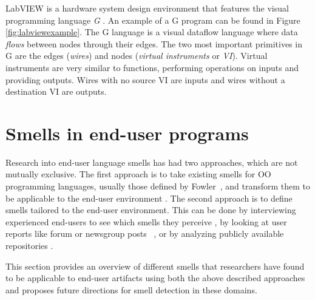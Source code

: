 \documentclass[10pt,conference,compsocconf]{IEEEtran}
\begin{document}
LabVIEW is a hardware system design environment that features the visual programming language \emph{G} . 
An example of a G program can be found in Figure \ref{fig:labviewexample}.
The G language is a visual dataflow language where data \emph{flows} between nodes through their edges.
The two most important primitives in G are the edges  (\textit{wires}) and nodes  (\textit{virtual instruments} or \emph{VI}).
Virtual instruments are very similar to functions,  performing  operations on inputs and providing outputs.
Wires with no source VI are inputs and wires without a destination VI are outputs. 


\section{Smells in end-user programs}
\label{sec:smells}
Research into end-user language smells has had two approaches, which are not mutually exclusive.
The first approach is to take existing smells for OO programming languages, usually those defined by Fowler~\cite{Fowl1999}, and transform them to be applicable to the end-user environment \cite{Hermans2012inter,Hermans2012intra,Stolee2011,StoleeTSE2013, chambers2013smell}.
The second approach is to define smells tailored to the end-user environment.
This can be done by interviewing experienced end-users to see which smells they perceive \cite{chambers2013smell}, by looking at user reports like forum or newsgroup posts~ \cite{badame2012refactoring,chambers2013smell}, or by analyzing publicly available repositories \cite{Stolee2011,StoleeTSE2013}.

This section provides an overview of different smells that researchers have found to be applicable to end-user artifacts using both the above described approaches and proposes future directions for smell detection in these domains. 
\end{document}

